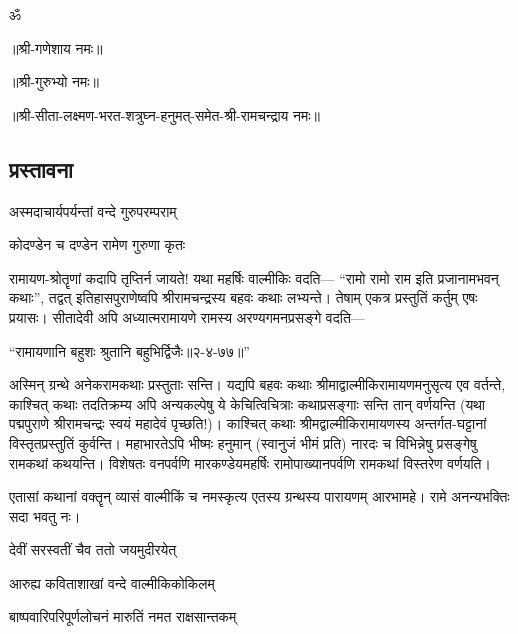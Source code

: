 
\begingroup
{}
\fontsize{12pt}{14.4pt}\selectfont
\centerline{\large{ॐ}}
\centerline{॥श्री-गणेशाय नमः॥}
\centerline{॥श्री-गुरुभ्यो नमः॥}
\centerline{॥श्री-सीता-लक्ष्मण-भरत-शत्रुघ्न-हनुमत्-समेत-श्री-रामचन्द्राय नमः॥}

\thispagestyle{empty}

\begin{center}
\chapter*{{प्रस्तावना}}
\end{center}

{अस्मदाचार्यपर्यन्तां वन्दे गुरुपरम्पराम्}

{कोदण्डेन च दण्डेन रामेण गुरुणा कृतः}

रामायण-श्रोतॄणां कदापि तृप्तिर्न जायते! यथा महर्षिः वाल्मीकिः वदति--- ``रामो रामो राम इति प्रजानामभवन् कथाः'', तद्वत् इतिहासपुराणेष्वपि श्रीरामचन्द्रस्य बहवः कथाः लभ्यन्ते। तेषाम् एकत्र प्रस्तुतिं कर्तुम् एषः प्रयासः। सीतादेवी अपि अध्यात्मरामायणे रामस्य अरण्यगमनप्रसङ्गे वदति---

\centerline{``रामायणानि बहुशः श्रुतानि बहुभिर्द्विजैः॥२-४-७७॥''} 

अस्मिन् ग्रन्थे अनेकरामकथाः प्रस्तुताः सन्ति। यद्यपि बहवः कथाः श्रीमाद्वाल्मीकिरामायण\-मनुसृत्य एव वर्तन्ते, काश्चित् कथाः तदतिक्रम्य अपि अन्यकल्पेषु ये केचित्विचित्राः कथाप्रसङ्गाः सन्ति तान् वर्णयन्ति (यथा पद्मपुराणे श्रीरामचन्द्रः स्वयं महादेवं पृच्छति!)। काश्चित् कथाः श्रीमद्वाल्मीकि\-रामायणस्य अन्तर्गत-घट्टानां विस्तृतप्रस्तुतिं कुर्वन्ति। महाभारतेऽपि भीष्मः हनुमान् (स्वानुजं भीमं प्रति) नारदः च विभिन्नेषु प्रसङ्गेषु रामकथां कथयन्ति। विशेषतः वनपर्वणि मारकण्डेयमहर्षिः रामोपाख्यानपर्वणि रामकथां विस्तरेण वर्णयति।

एतासां कथानां वक्तॄन् व्यासं वाल्मीकिं च नमस्कृत्य एतस्य ग्रन्थस्य पारायणम् आरभामहे। रामे अनन्यभक्तिः सदा भवतु नः। 

{देवीं सरस्वतीं चैव ततो जयमुदीरयेत्}

{आरुह्य कविताशाखां वन्दे वाल्मीकिकोकिलम्}


{बाष्पवारिपरिपूर्णलोचनं मारुतिं नमत राक्षसान्तकम्}

